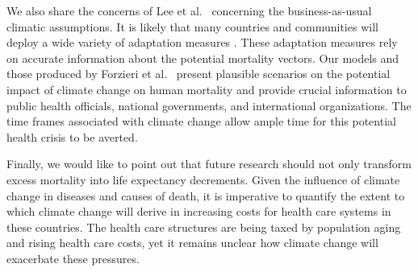 \documentclass[12pt]{article}
\begin{document}
We also share the concerns of Lee et al.~\citep{lee2017comprehensive}
concerning the business-as-usual climatic assumptions. It is likely that
many countries and communities will deploy a wide variety of adaptation
measures \citep{haines2006climate, kovats2003methods, ebi2006approach}.
These adaptation measures rely on accurate information about the
potential mortality vectors. Our models and those produced by Forzieri
et al.~\citep{forzieri2017increasing} present plausible scenarios on the
potential impact of climate change on human mortality and provide
crucial information to public health officials, national governments,
and international organizations. The time frames associated with climate
change allow ample time for this potential health crisis to be averted.

Finally, we would like to point out that future research should not only
transform excess mortality into life expectancy decrements. Given the
influence of climate change in diseases and causes of death, it is
imperative to quantify the extent to which climate change will derive in
increasing costs for health care systems in these countries. The health
care structures are being taxed by population aging
\citep{rechel2009can} and rising health care costs, yet it remains
unclear how climate change will exacerbate these pressures.



\end{document}
